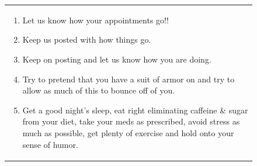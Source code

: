\begin{figure}
    \begin{tabular}[t]{@{}>{\raggedright\arraybackslash}p{}}
    \vspace{1mm}
    \begin{enumerate} [before=\itshape,font=\normalfont] \setlength\itemsep{0em} \footnotesize
    \item Let us know how your appointments go!!
    \item Keep us posted with how things go.
    \item Keep on posting and let us know how you are doing.
    \item Try to pretend that you have a suit of armor on and try to allow as much of this to bounce off of you.
    \item Get a good night's sleep, eat right eliminating caffeine \& sugar from your diet, take your meds as prescribed, avoid stress as much as possible, get plenty of exercise and hold onto your sense of humor.
    \end{enumerate}
    \end{tabular}
    \begin{tabular}[t]{@{}>{\raggedright\arraybackslash}p{}@{}}
    

\end{tabular}
\end{figure}
